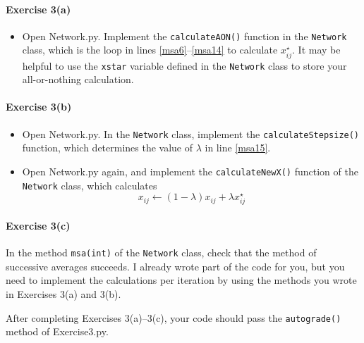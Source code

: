 \documentclass[11pt]{article}
\begin{document}




\paragraph*{Exercise 3(a)} 
\begin{itemize}

	
	\item Open Network.py. Implement the \texttt{calculateAON()} function in the \texttt{Network} class, which is the loop in lines \ref{msa6}--\ref{msa14} to calculate $x^\star_{ij}$. It may be helpful to use the \texttt{xstar} variable defined in the \texttt{Network} class to store your all-or-nothing calculation.

\end{itemize}


\paragraph*{Exercise 3(b)} 
\begin{itemize}
	
	
	\item Open Network.py. In the \texttt{Network} class, implement the \texttt{calculateStepsize()} function, which determines the value of $\lambda$ in line \ref{msa15}. 
	
	\item Open Network.py again, and implement the \texttt{calculateNewX()} function of the \texttt{Network} class, which calculates
	$$
	x_{ij} \leftarrow (1-\lambda) x_{ij} + \lambda x^\star_{ij}
	$$
\end{itemize}


\paragraph*{Exercise 3(c)} 

In the method \texttt{msa(int)} of the \texttt{Network} class, check that  the method of successive averages succeeds. I already wrote part of the code for you, but you need to implement the calculations per iteration by using the methods you wrote in Exercises 3(a) and 3(b).


\vspace\baselineskip

	\noindent
	After completing Exercises 3(a)--3(c), your code should pass the \texttt{autograde()} method of Exercise3.py. 
	
	
	
	
	
\end{document}
